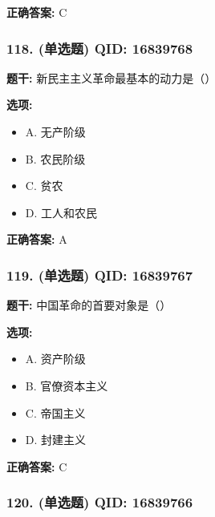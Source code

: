 \documentclass[12pt,UTF8]{ctexart}
\begin{document}
\textbf{正确答案:}
C

\vspace{0.3em}\hrulefill\vspace{0.7em}

\subsubsection*{118. (单选题) \small QID: 16839768}

\textbf{题干:}
新民主主义革命最基本的动力是（）

\textbf{选项:}
\begin{itemize}[leftmargin=*]

  \item A. 无产阶级

  \item B. 农民阶级

  \item C. 贫农

  \item D. 工人和农民

\end{itemize}

\textbf{正确答案:}
A

\vspace{0.3em}\hrulefill\vspace{0.7em}

\subsubsection*{119. (单选题) \small QID: 16839767}

\textbf{题干:}
中国革命的首要对象是（）

\textbf{选项:}
\begin{itemize}[leftmargin=*]

  \item A. 资产阶级

  \item B. 官僚资本主义

  \item C. 帝国主义

  \item D. 封建主义

\end{itemize}

\textbf{正确答案:}
C

\vspace{0.3em}\hrulefill\vspace{0.7em}

\subsubsection*{120. (单选题) \small QID: 16839766}
\end{document}

